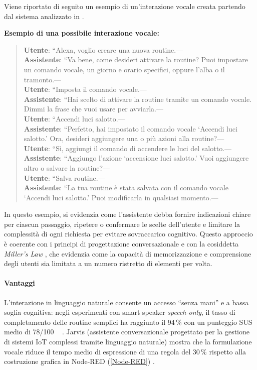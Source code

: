 Viene riportato di seguito un esempio di un'interazione vocale creata partendo dal sistema analizzato in \cite{Barricelli2024}. 

\noindent \textbf{Esempio di una possibile interazione vocale:}
\begin{quote}
\textbf{Utente}: “Alexa, voglio creare una nuova routine.—\\
\textbf{Assistente}: “Va bene, come desideri attivare la routine? Puoi impostare un comando vocale, un giorno e orario specifici, oppure l’alba o il tramonto.—\\
\textbf{Utente}: “Imposta il comando vocale.—\\
\textbf{Assistente}: “Hai scelto di attivare la routine tramite un comando vocale. Dimmi la frase che vuoi usare per avviarla.—\\
\textbf{Utente}: “Accendi luci salotto.—\\
\textbf{Assistente}: “Perfetto, hai impostato il comando vocale ‘Accendi luci salotto.’ Ora, desideri aggiungere una o più azioni alla routine?—\\
\textbf{Utente}: “Sì, aggiungi il comando di accendere le luci del salotto.—\\
\textbf{Assistente}: “Aggiungo l’azione ‘accensione luci salotto.’ Vuoi aggiungere altro o salvare la routine?—\\
\textbf{Utente}: “Salva routine.—\\
\textbf{Assistente}: “La tua routine è stata salvata con il comando vocale ‘Accendi luci salotto.’ Puoi modificarla in qualsiasi momento.—
\end{quote}

\noindent In questo esempio, si evidenzia come l'assistente debba fornire indicazioni chiare per ciascun passaggio, ripetere o confermare le scelte dell'utente e limitare la complessità di ogni richiesta per evitare sovraccarico cognitivo. Questo approccio è coerente con i principi di progettazione conversazionale e con la cosiddetta \emph{Miller’s Law} \cite{Miller1994}, che evidenzia come la capacità di memorizzazione e comprensione degli utenti sia limitata a un numero ristretto di elementi per volta.

\paragraph{Vantaggi}
\noindent
\newline \newline L’interazione in linguaggio naturale consente un accesso ``senza mani'' e a bassa soglia cognitiva: negli esperimenti con smart speaker \emph{speech‑only}, il tasso di completamento delle routine semplici ha raggiunto il 94\,\% con un punteggio SUS medio di 78/100 ~\cite{Barricelli2024, Lago2021, Brooke1996} .  
Jarvis (assistente conversazionale progettato per la gestione di sistemi IoT complessi tramite linguaggio naturale) \cite{Lago2021} mostra che la formulazione vocale riduce il tempo medio di espressione di una regola del 30\,\% rispetto alla costruzione grafica in Node‑RED (\ref{Node-RED}) \cite{Lago2021}.  

